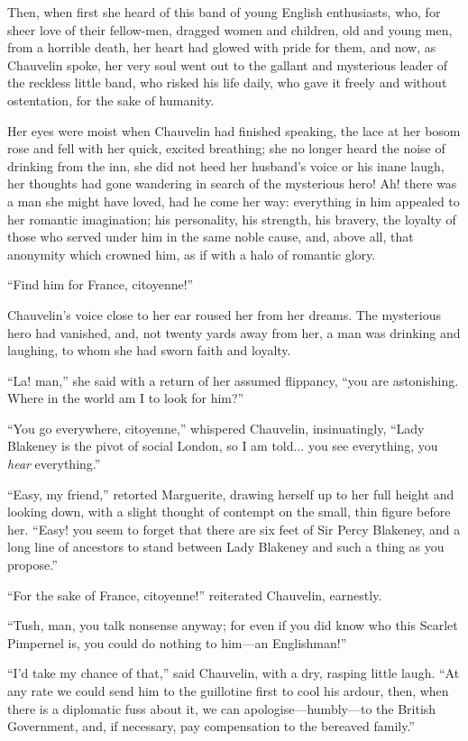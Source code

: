 \documentclass[paper=a5,BCOR=7mm,twoside,DIV=calc,12pt,usegeometry,chapterprefix,endperiod,headings=big]{scrbook}
\begin{document}
Then, when first she heard of this band of young English enthusiasts, who, for sheer love of their fellow-men, dragged women and children, old and young men, from a horrible death, her heart had glowed with pride for them, and now, as Chauvelin spoke, her very soul went out to the gallant and mysterious leader of the reckless little band, who risked his life daily, who gave it freely and without ostentation, for the sake of humanity.

Her eyes were moist when Chauvelin had finished speaking, the lace at her bosom rose and fell with her quick, excited breathing; she no longer heard the noise of drinking from the inn, she did not heed her husband's voice or his inane laugh, her thoughts had gone wandering in search of the mysterious hero! Ah! there was a man she might have loved, had he come her way: everything in him appealed to her romantic imagination; his personality, his strength, his bravery, the loyalty of those who served under him in the same noble cause, and, above all, that anonymity which crowned him, as if with a halo of romantic glory.

\enquote{Find him for France, citoyenne!}

Chauvelin's voice close to her ear roused her from her dreams. The mysterious hero had vanished, and, not twenty yards away from her, a man was drinking and laughing, to whom she had sworn faith and loyalty.

\enquote{La! man,} she said with a return of her assumed flippancy, \enquote{you are astonishing. Where in the world am I to look for him?}

\enquote{You go everywhere, citoyenne,} whispered Chauvelin, insinuatingly, \enquote{Lady Blakeney is the pivot of social London, so I am told... you see everything, you \textit{hear} everything.}

\enquote{Easy, my friend,} retorted Marguerite, drawing herself up to her full height and looking down, with a slight thought of contempt on the small, thin figure before her. \enquote{Easy! you seem to forget that there are six feet of Sir Percy Blakeney, and a long line of ancestors to stand between Lady Blakeney and such a thing as you propose.}

\enquote{For the sake of France, citoyenne!} reiterated Chauvelin, earnestly.

\enquote{Tush, man, you talk nonsense anyway; for even if you did know who this Scarlet Pimpernel is, you could do nothing to him---an Englishman!}

\enquote{I'd take my chance of that,} said Chauvelin, with a dry, rasping little laugh. \enquote{At any rate we could send him to the guillotine first to cool his ardour, then, when there is a diplomatic fuss about it, we can apologise---humbly---to the British Government, and, if necessary, pay compensation to the bereaved family.}
\end{document}
